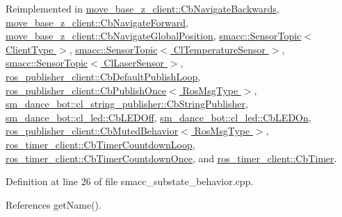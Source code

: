Reimplemented in \hyperlink{classmove__base__z__client_1_1CbNavigateBackwards_a1160c6f750789c4e88f46c54a3df2a1e}{move\+\_\+base\+\_\+z\+\_\+client\+::\+Cb\+Navigate\+Backwards}, \hyperlink{classmove__base__z__client_1_1CbNavigateForward_aa0f004dd176ca62dfddb836a52aa4376}{move\+\_\+base\+\_\+z\+\_\+client\+::\+Cb\+Navigate\+Forward}, \hyperlink{classmove__base__z__client_1_1CbNavigateGlobalPosition_a99a2669387427f71a316e08db3bbcc00}{move\+\_\+base\+\_\+z\+\_\+client\+::\+Cb\+Navigate\+Global\+Position}, \hyperlink{classsmacc_1_1SensorTopic_a3d667ad8340bd04a8a6b84eccfebe3f0}{smacc\+::\+Sensor\+Topic$<$ Client\+Type $>$}, \hyperlink{classsmacc_1_1SensorTopic_a3d667ad8340bd04a8a6b84eccfebe3f0}{smacc\+::\+Sensor\+Topic$<$ Cl\+Temperature\+Sensor $>$}, \hyperlink{classsmacc_1_1SensorTopic_a3d667ad8340bd04a8a6b84eccfebe3f0}{smacc\+::\+Sensor\+Topic$<$ Cl\+Laser\+Sensor $>$}, \hyperlink{classros__publisher__client_1_1CbDefaultPublishLoop_a47605e0cb9236077c9d9b0c42db9708c}{ros\+\_\+publisher\+\_\+client\+::\+Cb\+Default\+Publish\+Loop}, \hyperlink{classros__publisher__client_1_1CbPublishOnce_a879c967bb3e5e894e61256629636fcbd}{ros\+\_\+publisher\+\_\+client\+::\+Cb\+Publish\+Once$<$ Ros\+Msg\+Type $>$}, \hyperlink{classsm__dance__bot_1_1cl__string__publisher_1_1CbStringPublisher_ac93cc1eb150140331cb3e560ec8249e2}{sm\+\_\+dance\+\_\+bot\+::cl\+\_\+string\+\_\+publisher\+::\+Cb\+String\+Publisher}, \hyperlink{classsm__dance__bot_1_1cl__led_1_1CbLEDOff_ad0db28985308dd486943d1f511c655ad}{sm\+\_\+dance\+\_\+bot\+::cl\+\_\+led\+::\+Cb\+L\+E\+D\+Off}, \hyperlink{classsm__dance__bot_1_1cl__led_1_1CbLEDOn_a60a82058c585b4d0398b531c1e1bdf0b}{sm\+\_\+dance\+\_\+bot\+::cl\+\_\+led\+::\+Cb\+L\+E\+D\+On}, \hyperlink{classros__publisher__client_1_1CbMutedBehavior_aad2c833afdc6f5d81f3ddce3c0f767e3}{ros\+\_\+publisher\+\_\+client\+::\+Cb\+Muted\+Behavior$<$ Ros\+Msg\+Type $>$}, \hyperlink{classros__timer__client_1_1CbTimerCountdownLoop_aa671fabe23945e85e65cee7a3c1e761b}{ros\+\_\+timer\+\_\+client\+::\+Cb\+Timer\+Countdown\+Loop}, \hyperlink{classros__timer__client_1_1CbTimerCountdownOnce_af2d3d5b803e19cd843db010d0406503a}{ros\+\_\+timer\+\_\+client\+::\+Cb\+Timer\+Countdown\+Once}, and \hyperlink{classros__timer__client_1_1CbTimer_a27d62ebacf667d4c2518c0416ee7b25b}{ros\+\_\+timer\+\_\+client\+::\+Cb\+Timer}.



Definition at line 26 of file smacc\+\_\+substate\+\_\+behavior.\+cpp.



References get\+Name().


